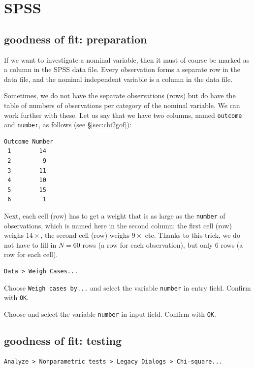 \documentclass[
]{book}
\begin{document}
\section{SPSS}\label{spss-14}

\subsection{goodness of fit: preparation}\label{goodness-of-fit-preparation}

If we want to investigate a nominal variable, then it must of course
be marked as a column in the SPSS data file. Every observation
forms a separate row in the data file, and the nominal independent
variable is a column in the data file.

Sometimes, we do not have the separate observations (rows) but
do have the table of numbers of observations per category of the nominal
variable. We can work further with these. Let us say that we have two columns,
named \texttt{outcome} and \texttt{number}, as follows
(see §\ref{sec:chi2gof}):

\begin{verbatim}
Outcome Number
 1        14
 2         9
 3        11
 4        10
 5        15
 6         1
\end{verbatim}

Next, each cell (row) has to get a weight that is as large as the
\texttt{number} of observations, which is named here in the second column: the
first cell (row) weighs \(14\times\), the second cell (row) weighs
\(9\times\) etc. Thanks to this trick, we do not have to fill in \(N=60\) rows
(a row for each observation), but only 6 rows (a row for each cell).

\begin{verbatim}
Data > Weigh Cases... 
\end{verbatim}

Choose \texttt{Weigh\ cases\ by...} and select the variable \texttt{number} in
entry field. Confirm with \texttt{OK}.

Choose and select the variable \texttt{number} in
input field. Confirm with \texttt{OK}.

\subsection{goodness of fit: testing}\label{goodness-of-fit-testing}

\begin{verbatim}
Analyze > Nonparametric tests > Legacy Dialogs > Chi-square...
\end{verbatim}
\end{document}
